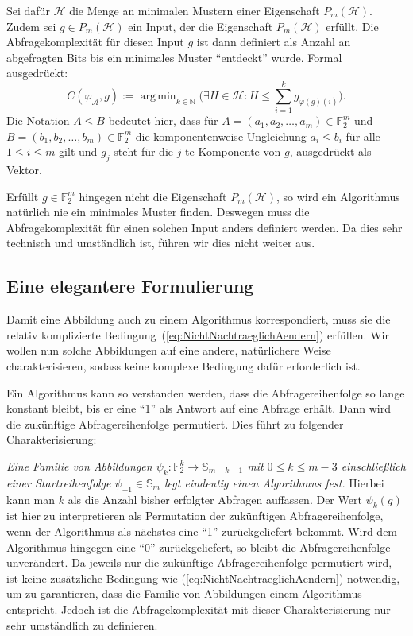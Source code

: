 \documentclass[10pt,a4paper, footheight=1mm, bibliography=totoc]{scrreprt}
\theoremstyle{definition}
\DeclareMathOperator*\argmin{arg\,min}
\begin{document}
Sei dafür $\mathcal{H}$ die Menge an minimalen
Mustern einer Eigenschaft $P_m(\mathcal{H})$.
Zudem sei $g\in P_m(\mathcal{H})$ ein Input, der die
Eigenschaft $P_m(\mathcal{H})$ erfüllt.
Die Abfragekomplexität für diesen Input $g$
ist dann definiert als Anzahl an abgefragten Bits
bis ein minimales Muster "`entdeckt"' wurde.
Formal ausgedrückt:
$$ C(\varphi_\mathcal{A}, g) :=
\argmin_{k\in\mathbb{N}} \Big(\exists H\in\mathcal{H}:
H \leq \sum_{i=1}^k g_{\varphi(g)(i)} \Big).
$$
Die Notation $A\leq B$ bedeutet hier, dass
für $A=(a_1, a_2, \dots, a_m)\in \mathbb{F}_2^m$
und $B=(b_1, b_2, \dots, b_m)\in \mathbb{F}_2^m$
die komponentenweise Ungleichung $a_i \leq b_i$
für alle $1\leq i\leq m$ gilt und $g_j$ steht für
die $j$-te Komponente von $g$, ausgedrückt als
Vektor.

Erfüllt $g\in\mathbb{F}_2^m$ hingegen nicht die
Eigenschaft $P_m(\mathcal{H})$, so wird ein Algorithmus
natürlich nie ein minimales Muster finden. Deswegen
muss die Abfragekomplexität für einen solchen
Input anders definiert werden. Da dies sehr 
technisch und umständlich ist, führen wir
dies nicht weiter aus.

\subsection{Eine elegantere Formulierung}
Damit eine Abbildung auch zu einem Algorithmus
korrespondiert, muss sie die relativ komplizierte
Bedingung~(\ref{eq:NichtNachtraeglichAendern})
erfüllen. Wir wollen nun solche Abbildungen
auf eine andere, natürlichere
Weise charakterisieren, sodass keine komplexe Bedingung
dafür erforderlich ist.

Ein Algorithmus kann so verstanden werden, dass die
Abfragereihenfolge so lange konstant bleibt, bis er
eine "`1"' als Antwort auf eine Abfrage erhält.
Dann wird die zukünftige Abfragereihenfolge
permutiert. Dies führt zu folgender Charakterisierung:

\emph{Eine Familie von Abbildungen 
$\psi_k:\mathbb{F}_2^k \to \mathbb{S}_{m-k-1}$
mit $0 \leq k \leq m-3$ einschließlich einer Startreihenfolge
$\psi_{-1}\in\mathbb{S}_m$ legt eindeutig einen Algorithmus fest.}
Hierbei kann man $k$ als die Anzahl bisher erfolgter Abfragen
auffassen. Der Wert $\psi_k(g)$ ist hier zu interpretieren
als Permutation der zukünftigen Abfragereihenfolge, wenn
der Algorithmus als nächstes eine "`1"' zurückgeliefert bekommt.
Wird dem Algorithmus hingegen eine "`0"' zurückgeliefert, so
bleibt die Abfragereihenfolge unverändert.
Da jeweils nur die zukünftige Abfragereihenfolge permutiert 
wird, ist keine zusätzliche Bedingung wie 
(\ref{eq:NichtNachtraeglichAendern}) notwendig, um zu garantieren,
dass die Familie von Abbildungen einem Algorithmus entspricht.
Jedoch ist die Abfragekomplexität mit dieser Charakterisierung
nur sehr umständlich zu definieren.
\end{document}
